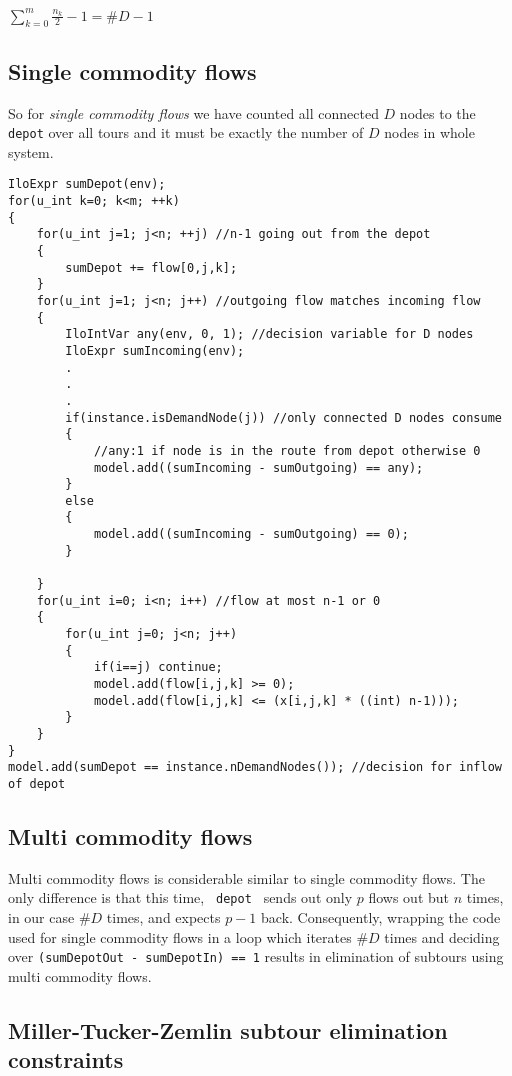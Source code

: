 \begin{center}
$\sum_{k=0}^{m}{\frac{n_k}{2}-1} = \#D - 1$
\end{center}

\subsection{Single commodity flows}

So for {\it single commodity flows} we have counted all connected $D$ nodes to
the \texttt{depot} over all tours and it must be exactly the number of $D$ nodes in whole system.

\begin{lstlisting}
IloExpr sumDepot(env);
for(u_int k=0; k<m; ++k)
{
    for(u_int j=1; j<n; ++j) //n-1 going out from the depot
    {
        sumDepot += flow[0,j,k];
    }
    for(u_int j=1; j<n; j++) //outgoing flow matches incoming flow
    {
        IloIntVar any(env, 0, 1); //decision variable for D nodes
        IloExpr sumIncoming(env);
        .
        .
        .
        if(instance.isDemandNode(j)) //only connected D nodes consume
        {
            //any:1 if node is in the route from depot otherwise 0
            model.add((sumIncoming - sumOutgoing) == any);
        }
        else
        {
            model.add((sumIncoming - sumOutgoing) == 0);
        }

    }
    for(u_int i=0; i<n; i++) //flow at most n-1 or 0
    {
        for(u_int j=0; j<n; j++)
        {
            if(i==j) continue;
            model.add(flow[i,j,k] >= 0);
            model.add(flow[i,j,k] <= (x[i,j,k] * ((int) n-1)));
        }
    }
}
model.add(sumDepot == instance.nDemandNodes()); //decision for inflow of depot
\end{lstlisting}

\subsection{Multi commodity flows}


Multi commodity flows is considerable similar to single commodity flows. The
only difference is that this time, \texttt{ depot } sends out only $p$ flows out
but $n$ times, in our case $\#D$ times, and expects $p-1$ back. Consequently,
wrapping the code used for single commodity flows in a loop which iterates $\#D$
times and deciding over \texttt{(sumDepotOut - sumDepotIn) == 1} results in
elimination of subtours using multi commodity flows.

\subsection{Miller-Tucker-Zemlin subtour elimination constraints}

